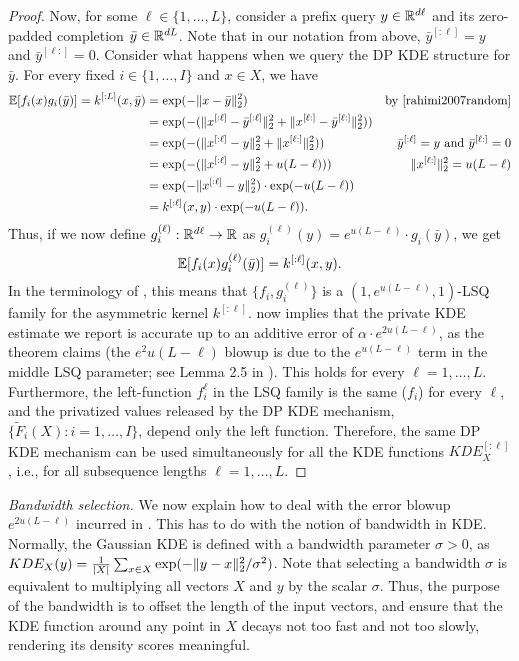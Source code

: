 \begin{proof}
Now, for some $\ell\in\{1,\ldots,L\}$, consider a prefix query $y\in\mathbb R^{d\ell}$ and its zero-padded completion $\bar y\in\mathbb R^{dL}$. Note that in our notation from above, $\bar y^{[:\ell]}=y$ and $\bar y^{[\ell:]}=0$. 
Consider what happens when we query the DP KDE structure for $\bar y$. For every fixed $i\in\{1,\ldots,I\}$ and $x\in X$, we have
\begin{align*}
 \mathbb E[f_i(x)g_i(\bar y)] = k^{[:L]}(x,\bar y) &= \exp(-\lVert x-\bar y\rVert_2^2) & \text{by \cite{rahimi2007random}} \\
 &= \exp(-(\lVert x^{[:\ell]}-\bar y^{[:\ell]}\rVert_2^2 + \lVert x^{[\ell:]}-\bar y^{[\ell:]}\rVert_2^2)) & \\
 &= \exp(-(\lVert x^{[:\ell]}-y\rVert_2^2 + \lVert x^{[\ell:]}\rVert_2^2)) & \text{$\bar y^{[:\ell]}=y$ and $\bar y^{[\ell:]}=0$}\\
 &= \exp(-(\lVert x^{[:\ell]}-y\rVert_2^2 + u(L-\ell))) & \lVert x^{[\ell:]}\rVert_2^2=u(L-\ell) \\
 &= \exp(-\lVert x^{[:\ell]}-y\rVert_2^2)\cdot \exp(-u(L-\ell)) & \\
 &= k^{[:\ell]}(x,y)\cdot \exp(-u(L-\ell)) . &
\end{align*}
Thus, if we now define $g_i^{(\ell)}:\mathbb R^{d\ell}\rightarrow\mathbb R$ as $g_i^{(\ell)}(y) = e^{u(L-\ell)} \cdot g_i(\bar y)$,
we get
\[ \mathbb E[f_i(x)g_i^{(\ell)}(\bar y)] = k^{[:\ell]}(x,y) . \]
In the terminology of \cite{wagner2023fast}, this means that $\{f_i,g_i^{(\ell)}\}$ is a $(1,e^{u(L-\ell)},1)$-LSQ family for the asymmetric kernel $k^{[:\ell]}$.  now implies that the private KDE estimate we report is accurate up to an additive error of $\alpha\cdot e^{2u(L-\ell)}$, as the theorem claims (the $e^2{u(L-\ell)}$ blowup is due to the $e^{u(L-\ell)}$ term in the middle LSQ parameter; see Lemma 2.5 in \cite{wagner2023fast}). 
This holds for every $\ell=1,\ldots,L$. Furthermore, the left-function $f_i^{\ell}$ in the LSQ family is the same ($f_i$) for every $\ell$, and the privatized values released by the DP KDE mechanism, $\{\tilde F_i(X):i=1,\ldots,I\}$, depend only the left function. Therefore, the same DP KDE mechanism can be used simultaneously for all the KDE functions $KDE^{[:\ell]}_X$, i.e., for all subsequence lengths $\ell=1,\ldots,L$.
\end{proof}

\noindent\emph{Bandwidth selection.}
We now explain how to deal with the error blowup $e^{2u(L-\ell)}$ incurred in . 
This has to do with the notion of bandwidth in KDE. 
Normally, the Gaussian KDE is defined with a bandwidth parameter $\sigma>0$, as $KDE_X(y)=\frac{1}{|X|}\sum_{x\in X}\exp(-\lVert y-x\rVert_2^2/\sigma^2)$. 
Note that selecting a bandwidth $\sigma$ is equivalent to multiplying all vectors $X$ and $y$ by the scalar $\sigma$. 
Thus, the purpose of the bandwidth is to offset the length of the input vectors, and ensure that the KDE function around any point in $X$ decays not too fast and not too slowly, rendering its density scores meaningful. 

